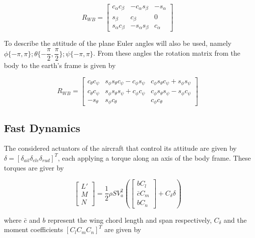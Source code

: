 \begin{equation}
R_{WB}=
\begin{bmatrix}
c_\alpha c_\beta & -c_\alpha s_\beta & -s_\alpha \\
s_\beta & c_\beta & 0 \\
s_\alpha c_\beta & -s_\alpha s_\beta & c_\alpha
\end{bmatrix}
\label{eq:wind2body}
\end{equation}

To describe the attitude of the plane Euler angles will also be used, namely $\phi\{-\pi,\pi\}; \theta \{-\dfrac{\pi}{2},\dfrac{\pi}{2}\}; \psi \{-\pi,\pi\}$. From these angles the rotation matrix from the body to the earth's frame is given by

\begin{equation}
R_{WB}=
\begin{bmatrix}
c_\theta c_\psi & s_\phi s_\theta c_\psi - c_\phi s_\psi & c_\phi s_\theta c_\psi + s_\phi s_\psi \\
c_\theta c_\psi & s_\phi s_\theta s_\psi + c_\phi c_\psi & c_\phi s_\theta s_\psi - s_\phi c_\psi \\
-s_\theta & s_\phi c_\theta & c_\phi c_\theta
\end{bmatrix}
\label{eq:body2earth}
\end{equation}

\subsection{Fast Dynamics}
\label{section:background/model/fast_dynamics}

The considered actuators of the aircraft that control its attitude are given by $\delta = [\delta_{ail} \delta_{ele} \delta_{rud}]^T$, each applying a torque along an axis of the body frame. These torques are giver by

\begin{equation}
\begin{bmatrix}
L'\\
M\\
N
\end{bmatrix}
= \dfrac{1}{2}\rho S V_a^2\left(
\begin{bmatrix}
bC_l\\
\bar{c}C_m\\
bC_n
\end{bmatrix}
+ C_\delta \delta\right)
\label{eq:torque}
\end{equation}

where $\bar{c}$ and $b$ represent the wing chord length and span respectively, $C_\delta$ and the moment coefficients $[C_l C_m C_n]^T$ are given by

